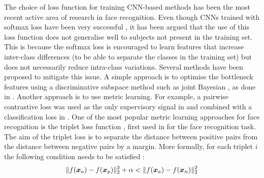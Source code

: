 \documentclass[conference]{IEEEtran}
\DeclarePairedDelimiter\norm{\lVert}{\rVert}
\begin{document}
The choice of loss function for training CNN-based methods has been the most recent active area of research in face recognition. Even though CNNs trained with softmax loss have been very successful \cite{taigman2014deepface,sun2014deep,yi2014learning,wu2015lightened}, it has been argued that the use of this loss function does not generalise well to subjects not present in the training set. This is because the softmax loss is encouraged to learn features that increase inter-class differences (to be able to separate the classes in the training set) but does not necessarily reduce intra-class variations. Several methods have been proposed to mitigate this issue. A simple approach is to optimise the bottleneck features using a discriminative subspace method such as joint Bayesian \cite{chen2012bayesian}, as done in \cite{sun2014deep,sun2014deep2,wst2008deeply,sun2015deepid3,yi2014learning,chen2016unconstrained}. Another approach is to use metric learning. For example, a pairwise contrastive loss was used as the only supervisory signal in \cite{chopra2005learning,fan2014learning} and combined with a classification loss in \cite{sun2014deep2,wst2008deeply,sun2015deepid3}. One of the most popular metric learning approaches for face recognition is the triplet loss function \cite{weinberger2009distance}, first used in \cite{schroff2015facenet} for the face recognition task. The aim of the triplet loss is to separate the distance between positive pairs from the distance between negative pairs by a margin. More formally, for each triplet $i$ the following condition needs to be satisfied \cite{schroff2015facenet}:
\begin{equation}
    \norm{f(\bm{x}_a)-f(\bm{x}_p)}_2^2 + \alpha < \norm{f(\bm{x}_a)-f(\bm{x}_n)}_2^2\label{eq:triplet_loss_condition}
\end{equation}
\end{document}
